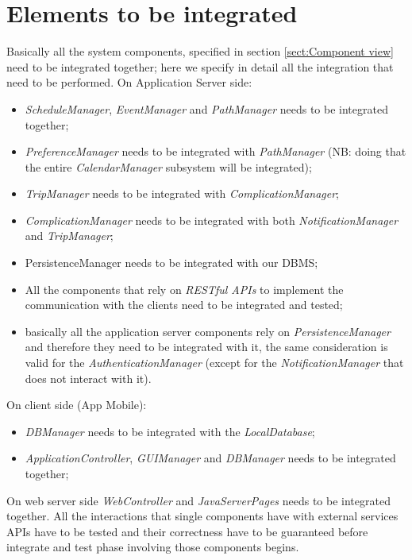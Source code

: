 \section{Elements to be integrated}
Basically all the system components, specified in section \ref{sect:Component view} need to be integrated together; here we specify in detail all the integration that need to be performed.
On Application Server side:
\begin{itemize}
	\item \textit{ScheduleManager}, \textit{EventManager} and \textit{PathManager} needs to be integrated together;
	\item \textit{PreferenceManager} needs to be integrated with \textit{PathManager} (NB: doing that the entire \textit{CalendarManager} subsystem will be integrated);
	\item \textit{TripManager} needs to be integrated with \textit{ComplicationManager};
	\item \textit{ComplicationManager} needs to be integrated with both \textit{NotificationManager} and \textit{TripManager};
	\item PersistenceManager needs to be integrated with our DBMS;
	\item All the components that rely on \textit{RESTful APIs} to implement the communication with the clients need to be integrated and tested;
	\item basically all the application server components rely on \textit{PersistenceManager} and therefore they need to be integrated with it, the same consideration is valid for the \textit{AuthenticationManager} (except for the \textit{NotificationManager} that does not interact with it).
\end{itemize}
On client side (App Mobile):
\begin{itemize}
	\item \textit{DBManager} needs to be integrated with the \textit{LocalDatabase};
	\item \textit{ApplicationController}, \textit{GUIManager} and \textit{DBManager} needs to be integrated together;
\end{itemize}
On web server side \textit{WebController} and \textit{JavaServerPages} needs to be integrated together.
All the interactions that single components have with external services APIs have to be tested and their correctness have to be guaranteed before integrate and test phase involving those components begins.

